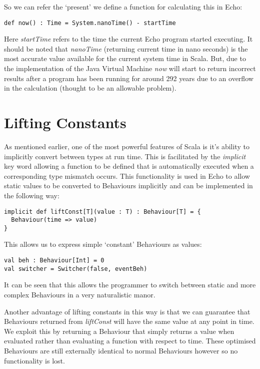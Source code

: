     So we can refer the `present' we define a function for calculating this in Echo:
    
\begin{verbatim}
def now() : Time = System.nanoTime() - startTime
\end{verbatim}      

    Here \emph{startTime} refers to the time the current Echo program started executing. It should be noted that \emph{nanoTime} (returning current time in
    nano seconds) is the most accurate value available for the current system time in Scala. But, due to the
    implementation of the Java Virtual Machine \emph{now} will start to return incorrect results 
    after a program has been running for around 292 years due to an overflow in the calculation (thought to be an allowable
    problem).

  \section{Lifting Constants}
    As mentioned earlier, one of the most powerful features of Scala is it's ability to implicitly convert between
    types at run time. This is facilitated by the \emph{implicit} key word allowing a function to be defined
    that is automatically executed when a corresponding type mismatch occurs. This functionality is used in Echo to allow 
    static values to be converted to Behaviours implicitly and can be implemented in the following way:

\begin{verbatim}
implicit def liftConst[T](value : T) : Behaviour[T] = {
  Behaviour(time => value)
}
\end{verbatim}              
    
    This allows us to express simple `constant' Behaviours as values:

\begin{verbatim}
val beh : Behaviour[Int] = 0
val switcher = Switcher(false, eventBeh)
\end{verbatim}       

    It can be seen that this allows the programmer to switch between static and more complex
    Behaviours in a very naturalistic manor.
    
    Another advantage of lifting constants in this way is that we can guarantee that Behaviours
    returned from \emph{liftConst} will have the same value at any point in time. We exploit this by returning a Behaviour
    that simply returns a value when evaluated rather than evaluating a function with respect to time. These optimised Behaviours are still externally identical to normal Behaviours however so no functionality is lost.
    
